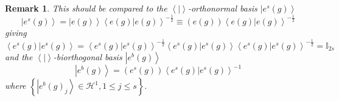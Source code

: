 \documentclass[aps,preprint]{revtex4}%
\newtheorem{remark}[theorem]{Remark}
\begin{document}
\begin{remark}
This should be compared to the $\left\langle \left.  {}\right\vert
\right\rangle $-orthonormal basis $\left\vert e^{s}\left(  g\right)
\right\rangle $
\begin{equation}
\left\vert e^{s}\left(  g\right)  \right\rangle =\left\vert e\left(  g\right)
\right\rangle \left\langle \left.  e\left(  g\right)  \right\vert e\left(
g\right)  \right\rangle ^{-\frac{1}{2}}\equiv\left(  e\left(  g\right)
\right)  \left\langle \left.  e\left(  g\right)  \right\vert e\left(
g\right)  \right\rangle ^{-\frac{1}{2}}%
\end{equation}
giving%
\begin{equation}
\left\langle \left.  e^{s}\left(  g\right)  \right\vert e^{s}\left(  g\right)
\right\rangle =\left\langle \left.  e^{s}\left(  g\right)  \right\vert
e^{s}\left(  g\right)  \right\rangle ^{-\frac{1}{2}}\left\langle \left.
e^{s}\left(  g\right)  \right\vert e^{s}\left(  g\right)  \right\rangle
\left\langle \left.  e^{s}\left(  g\right)  \right\vert e^{s}\left(  g\right)
\right\rangle ^{-\frac{1}{2}}=\mathbb{I}_{2s}%
\end{equation}
and the $\left\langle \left.  {}\right\vert \right\rangle $-biorthogonal basis
$\left\vert e^{b}\left(  g\right)  \right\rangle $
\begin{equation}
\left\vert e^{b}\left(  g\right)  \right\rangle =\left(  e^{s}\left(
g\right)  \right)  \left\langle \left.  e^{s}\left(  g\right)  \right\vert
e^{s}\left(  g\right)  \right\rangle ^{-1}%
\end{equation}
where $\left\{  \left\vert e^{b}\left(  g\right)  _{j}\right\rangle
\in\mathcal{H}^{1},1\leq j\leq s\right\}  .$
\end{remark}
\end{document}
